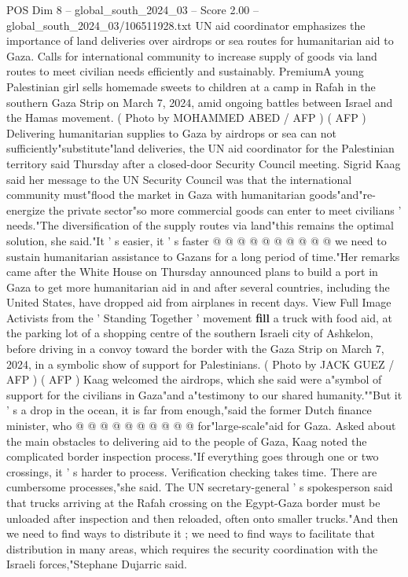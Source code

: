 \begin{textsample}{POS Dim 8 – global\_south\_2024\_03 – Score 2.00 – global\_south\_2024\_03/106511928.txt}  \label{ex:f8_pos_428}
UN aid coordinator emphasizes the importance of land deliveries over airdrops or sea routes for humanitarian aid to Gaza.
Calls for international community to increase supply of goods via land routes to meet civilian needs efficiently and sustainably.
PremiumA young Palestinian girl sells homemade sweets to children at a camp in Rafah in the southern Gaza Strip on March 7, 2024, amid ongoing battles between Israel and the Hamas movement. ( Photo by MOHAMMED ABED / AFP ) ( AFP ) Delivering humanitarian supplies to Gaza by airdrops or sea can not sufficiently"substitute"land deliveries, the UN aid coordinator for the Palestinian territory said Thursday after a closed-door Security Council meeting.
Sigrid Kaag said her message to the UN Security Council was that the international community must"flood the market in Gaza with humanitarian goods"and"re-energize the private sector"so more commercial goods can enter to meet civilians ' needs."The diversification of the supply routes via land"this remains the optimal solution, she said."It ' s easier, it ' s faster @ @ @ @ @ @ @ @ @ @ we need to sustain humanitarian assistance to Gazans for a long period of time."Her remarks came after the White House on Thursday announced plans to build a port in Gaza to get more humanitarian aid in and after several countries, including the United States, have dropped aid from airplanes in recent days.
View Full Image Activists from the ' Standing Together ' movement \textbf{fill} a truck with food aid, at the parking lot of a shopping centre of the southern Israeli city of Ashkelon, before driving in a convoy toward the border with the Gaza Strip on March 7, 2024, in a symbolic show of support for Palestinians. ( Photo by JACK GUEZ / AFP ) ( AFP ) Kaag welcomed the airdrops, which she said were a"symbol of support for the civilians in Gaza"and a"testimony to our shared humanity.""But it ' s a drop in the ocean, it is far from enough,"said the former Dutch finance minister, who @ @ @ @ @ @ @ @ @ @ for"large-scale"aid for Gaza.
Asked about the main obstacles to delivering aid to the people of Gaza, Kaag noted the complicated border inspection process."If everything goes through one or two crossings, it ' s harder to process.
Verification checking takes time.
There are cumbersome processes,"she said.
The UN secretary-general ' s spokesperson said that trucks arriving at the Rafah crossing on the Egypt-Gaza border must be unloaded after inspection and then reloaded, often onto smaller trucks."And then we need to find ways to distribute it ; we need to find ways to facilitate that distribution in many areas, which requires the security coordination with the Israeli forces,"Stephane Dujarric said.

\end{textsample}
